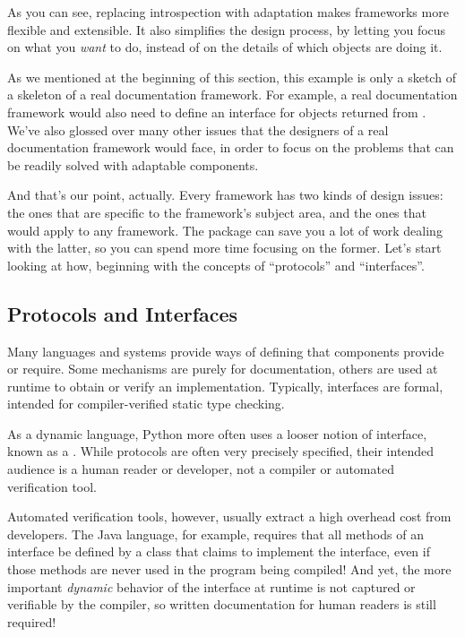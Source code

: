 \begin{verbatim%
}
\begin{verbatim%
}
As you can see, replacing introspection with adaptation makes frameworks more
flexible and extensible.  It also simplifies the design process, by letting you
focus on what you \emph{want} to do, instead of on the details of which objects
are doing it.

As we mentioned at the beginning of this section, this example is only a sketch
of a skeleton of a real documentation framework.  For example, a real
documentation framework would also need to define an 
interface for objects returned from .  We've also
glossed over many other issues that the designers of a real documentation
framework would face, in order to focus on the problems that can be readily
solved with adaptable components.

And that's our point, actually.  Every framework has two kinds of design
issues: the ones that are specific to the framework's subject area, and the
ones that would apply to any framework.  The  package can
save you a lot of work dealing with the latter, so you can spend more time
focusing on the former.  Let's start looking at how, beginning with the
concepts of ``protocols'' and ``interfaces''.












\subsection{Protocols and Interfaces \label{protocol-concepts}}

Many languages and systems provide ways of defining  that
components provide or require.  Some mechanisms are purely for documentation,
others are used at runtime to obtain or verify an implementation.  Typically,
interfaces are formal, intended for compiler-verified static type checking.

As a dynamic language, Python more often uses a looser notion of interface,
known as a .  While protocols are often very precisely
specified, their intended audience is a human reader or developer, not a
compiler or automated verification tool.

Automated verification tools, however, usually extract a high overhead cost
from developers.  The Java language, for example, requires that all methods
of an interface be defined by a class that claims to implement the
interface, even if those methods are never used in the program being
compiled!  And yet, the more important \emph{dynamic} behavior of the
interface at runtime is not captured or verifiable by the compiler, so written
documentation for human readers is still required!


\end{verbatim%
}
\end{verbatim%
}
